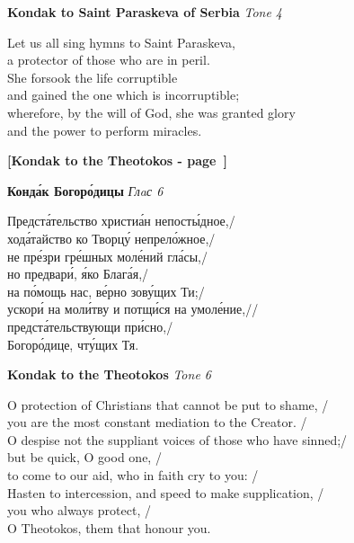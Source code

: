 \documentclass[twoside]{article}
\newcommand{\LITTITLE}[1]{\textbf{#1}} %
\newcommand{\LITSUB}  [1]{\textit{#1}} %
\begin{document}
\begin{paracol}{2}
\begin{paracol}{2}
\switchcolumn

\LITTITLE{Kondak to Saint Paraskeva of Serbia}
\LITSUB{Tone 4}

Let us all sing hymns to Saint Paraskeva, \\
a protector of those who are in peril. \\
She forsook the life corruptible \\
and gained the one which is incorruptible; \\
wherefore, by the will of God, she was granted glory \\
and the power to perform miracles.

\end{paracol}

\LITTITLE{[Kondak to the Theotokos - page~\pageref{Theotokos_Kondak}]}

\begin{paracol}{2}

{
\LITTITLE{Конд\'{а}к Богор\'{о}дицы}
\LITSUB{Глaс 6}

Предст\'{а}тельство христи\'{а}н непост\'{ы}дное,/ \\
ход\'{а}тайство ко Творц\'{у} непрел\'{о}жное,/ \\
не пр\'{е}зри гр\'{е}шных мол\'{е}ний гл\'{а}сы,/ \\
но предвар\'{и}, \'{я}ко Благ\'{а}я,/ \\
на п\'{о}мощь нас, в\'{е}рно зов\'{у}щих Ти;/ \\
ускор\'{и} на мол\'{и}тву и потщ\'{и}ся на умол\'{е}ние,// \\
предст\'{а}тельствующи пр\'{и}сно,/ \\
Богор\'{о}дице, чт\'{у}щих Тя.
}
\switchcolumn

\LITTITLE{Kondak to the Theotokos}
\LITSUB{Tone 6}

O protection of Christians that cannot be put to shame, / \\
you are the most constant mediation to the Creator. / \\
O despise not the suppliant voices of those who have sinned;/ \\
but be quick, O good one, / \\
to come to our aid, who in faith cry to you: / \\
Hasten to intercession, and speed to make supplication, / \\
you who always protect, / \\
O Theotokos, them that honour you.


\end{paracol}
\end{paracol}
\end{document}
